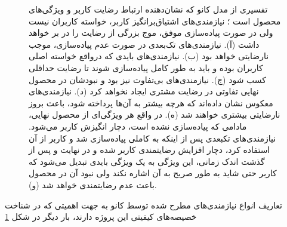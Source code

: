\begin{figure}[H]
{	}
	\hspace{0mm}
	\caption[تفسیری از مدل کانو]
	{تفسیری از مدل کانو که نشان‌دهنده ارتباط رضایت کاربر و ویژگی‌های محصول است
		\cite{noauthor_leveraging_2012}؛
		نیازمندی‌های اشتیاق‌برانگیز کاربر، خواسته کاربران نیست ولی در صورت پیاده‌سازی موفق، موج بزرگی از رضایت را در بر خواهد داشت (آ). نیازمندی‌های تک‌بعدی در صورت عدم پیاده‌سازی، موجب نارضایتی خواهد بود (ب). نیازمندی‌های بایدی که درواقع خواسته اصلی کاربران بوده و باید به طور کامل پیاده‌سازی شوند تا رضایت حداقلی کسب شود (ج). نیازمندی‌های بی‌تفاوت نیز بود و نبودشان در محصول نهایی تفاوتی در رضایت مشتری ایجاد نخواهد کرد (د). نیازمندی‌های معکوس نشان داده‌اند که هرچه بیشتر به آن‌ها پرداخته شود، باعث بروز نارضایتی بیشتری خواهند شد (ه). در واقع هر ویژگی‌ای از محصول نهایی، مادامی که پیاده‌سازی نشده است، دچار انگیزش کاربر می‌شود. نیازمندی‌های تکبعدی پس از اینکه به کاملی پیاده‌سازی شد و کاربر از آن استفاده کرد، دچار افزایش رضایتمندی کاربر شده و در نهایت و پس از گذشت اندک زمانی، این ویژگی به یک ویژگی بایدی تبدیل می‌شود که کاربر حتی شاید به طور صریح به آن اشاره نکند ولی نبود آن در محصول باعث عدم رضایتمندی خواهد شد (و).
	}
	\label{fig:kano2}
\end{figure}
تعاریف انواع نیازمندی‌های مطرح شده توسط کانو به جهت اهمیتی که در شناخت خصیصه‌های کیفیتی این پروژه دارند، بار دیگر در شکل
\ref{fig:kano2}
